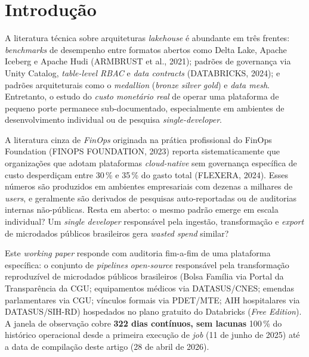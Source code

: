\documentclass[12pt,a4paper,oneside]{article}
\begin{document}
\newpage

\section{Introdução}

A literatura técnica sobre arquiteturas \textit{lakehouse} é
abundante em três frentes: \textit{benchmarks} de desempenho entre
formatos abertos como Delta Lake, Apache Iceberg e Apache Hudi
(ARMBRUST et al., 2021); padrões de governança via Unity Catalog,
\textit{table-level RBAC} e \textit{data contracts}
(DATABRICKS, 2024); e padrões arquiteturais como o \textit{medallion}
(\textit{bronze} \textrightarrow{} \textit{silver}
\textrightarrow{} \textit{gold}) e \textit{data mesh}. Entretanto,
o estudo do \textit{custo monetário real} de operar uma plataforma
de pequeno porte permanece sub-documentado, especialmente em
ambientes de desenvolvimento individual ou de pesquisa
\textit{single-developer}.

A literatura cinza de \textit{FinOps} \textemdash{} originada na
prática profissional do FinOps Foundation (FINOPS FOUNDATION, 2023)
\textemdash{} reporta sistematicamente que organizações que adotam
plataformas \textit{cloud-native} sem governança específica de
custo desperdiçam entre 30\,\% e 35\,\% do gasto total
(FLEXERA, 2024). Esses números são produzidos em ambientes
empresariais com dezenas a milhares de \textit{users}, e geralmente
são derivados de pesquisas auto-reportadas ou de auditorias internas
não-públicas. Resta em aberto: o mesmo padrão emerge em escala
individual? Um \textit{single developer} responsável pela ingestão,
transformação e \textit{export} de microdados públicos brasileiros
gera \textit{wasted spend} similar?

Este \textit{working paper} responde com auditoria fim-a-fim de
uma plataforma específica: o conjunto de \textit{pipelines}
\textit{open-source} responsável pela transformação reproduzível
de microdados públicos brasileiros (Bolsa Família via Portal da
Transparência da CGU; equipamentos médicos via DATASUS/CNES;
emendas parlamentares via CGU; vínculos formais via PDET/MTE; AIH
hospitalares via DATASUS/SIH-RD) hospedados no plano gratuito do
Databricks (\textit{Free Edition}). A janela de observação cobre
\textbf{322 dias contínuos, sem lacunas} \textemdash{} 100\,\% do
histórico operacional desde a primeira execução de \textit{job}
(11 de junho de 2025) até a data de compilação deste artigo
(28 de abril de 2026).
\end{document}
